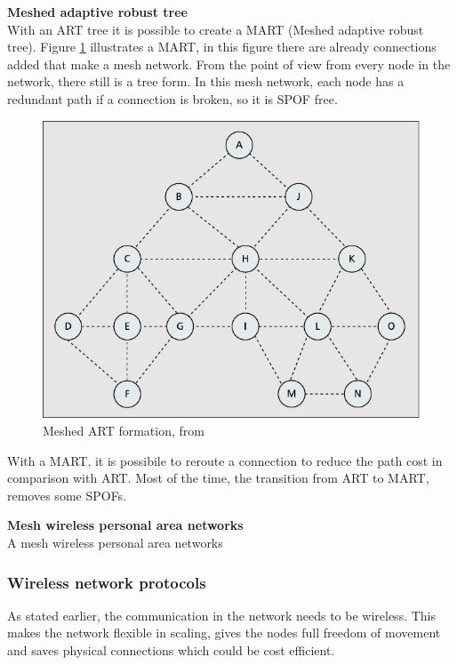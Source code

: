 \documentclass[10pt,a4paper]{article}
\begin{document}
\textbf{\large Meshed adaptive robust tree}\\
With an ART tree it is possible to create a MART (Meshed adaptive robust tree). Figure \ref{fig:meshtree} illustrates a MART, in this figure there are already connections added that make a mesh network. From the point of view from every node in the network, there still is a tree form. In this mesh network, each node has a redundant path if a connection is broken, so it is SPOF free.

\begin{figure}[H]
   \centering
   \includegraphics[width=1\textwidth]{meshtree}
   \caption{Meshed ART formation, from \cite{emergingstandarsforwirelessmeshtechnology}}
   \label{fig:meshtree}
\end{figure}

With a MART, it is possibile to reroute a connection to reduce the path cost in comparison with ART. Most of the time, the transition from ART to MART, removes some SPOFs.

\textbf{\large Mesh wireless personal area networks}\\
A mesh wireless personal area networks


\subsubsection{Wireless network protocols}
As stated earlier, the communication in the network needs to be wireless. This makes the network flexible in scaling, gives the nodes full freedom of movement and saves physical connections which could be cost efficient.
\end{document}
